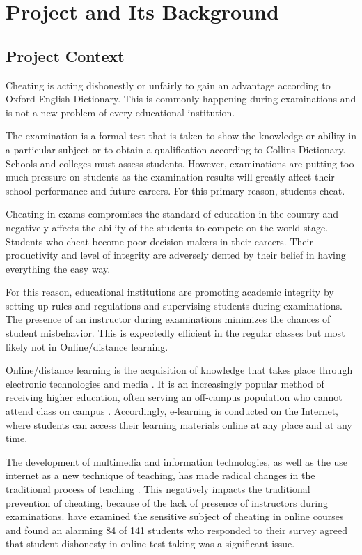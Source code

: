 \chapter{Project and Its Background}

\section{Project Context}

Cheating is acting dishonestly or unfairly to gain an advantage according to Oxford English Dictionary.
This is commonly happening during examinations and is not a new problem of every educational institution.

The examination is a formal test that is taken to show the knowledge or ability in a particular subject or to obtain a qualification according to Collins Dictionary.
Schools and colleges must assess students.
However, examinations are putting too much pressure on students as the examination results will greatly affect their school performance and future careers.
For this primary reason, students cheat.

Cheating in exams compromises the standard of education in the country and negatively affects the ability of the students to compete on the world stage.
Students who cheat become poor decision-makers in their careers.
Their productivity and level of integrity are adversely dented by their belief in having everything the easy way.

For this reason, educational institutions are promoting academic integrity by setting up rules and regulations and supervising students during examinations.
The presence of an instructor during examinations minimizes the chances of student misbehavior.
This is expectedly efficient in the regular classes but most likely not in Online/distance learning.

Online/distance learning is the acquisition of knowledge that takes place through electronic technologies and media \cite{abernathy2020elearning}.
It is an increasingly popular method of receiving higher education, often serving an off-campus population who cannot attend class on campus \cite{daffin2018comparing}.
Accordingly, e-learning is conducted on the Internet, where students can access their learning materials online at any place and at any time.

The development of multimedia and information technologies, as well as the use internet as a new technique of teaching, has made radical changes in the traditional process of teaching \cite{liu2009comparative}.
This negatively impacts the traditional prevention of cheating, because of the lack of presence of instructors during examinations.
 have examined the sensitive subject of cheating in online courses and found an alarming 84 of 141 students who responded to their survey agreed that student dishonesty in online test-taking was a significant issue.

